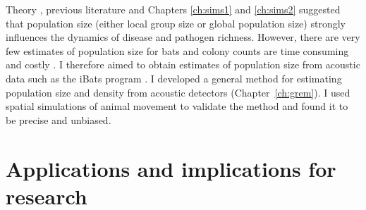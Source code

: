 
Theory \cite{may1979population, anderson1979population}, previous literature \cite{kamiya2014determines, nunn2003comparative, morand1998density} and Chapters \ref{ch:sims1} and \ref{ch:sims2} suggested that population size (either local group size or global population size) strongly influences the dynamics of disease and pathogen richness.
However, there are very few estimates of population size for bats and colony counts are time consuming and costly \cite{kloepper2016estimating}.
I therefore aimed to obtain estimates of population size from acoustic data such as the iBats program \cite{jones2011indicator}.
I developed a general method for estimating population size and density from acoustic detectors (Chapter~\ref{ch:grem}).
I used spatial simulations of animal movement to validate the method and found it to be precise and unbiased.






\section{Applications and implications for research}

